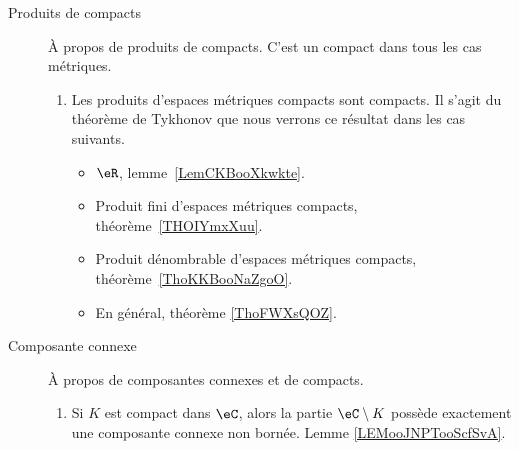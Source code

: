 \begin{description}
	\item[Produits de compacts]
		À propos de produits de compacts. C'est un compact dans tous les cas métriques.
		\begin{enumerate}
			\item
			      Les produits d'espaces métriques compacts sont compacts. Il s'agit du théorème de Tykhonov que nous verrons ce résultat dans les cas suivants.
			      \begin{itemize}
				      \item
				            \( \eR\), lemme~\ref{LemCKBooXkwkte}.
				      \item
				            Produit fini d'espaces métriques compacts, théorème~\ref{THOIYmxXuu}.
				      \item
				            Produit dénombrable d'espaces métriques compacts, théorème~\ref{ThoKKBooNaZgoO}.
				      \item
				            En général, théorème \ref{ThoFWXsQOZ}.
			      \end{itemize}
		\end{enumerate}
	\item[Composante connexe]
		À propos de composantes connexes et de compacts.
		\begin{enumerate}
			\item
			      Si \( K\) est compact dans \( \eC\), alors la partie \( \eC\setminus K\) possède exactement une composante connexe non bornée. Lemme \ref{LEMooJNPTooScfSvA}.
		\end{enumerate}
\end{description}

